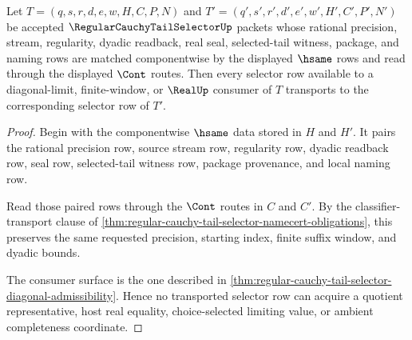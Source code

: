 \begin{theorem}
\label{thm:regular-cauchy-tail-selector-classifier-transport}
Let $T=(q,s,r,d,e,w,H,C,P,N)$ and $T'=(q',s',r',d',e',w',H',C',P',N')$ be accepted $\RegularCauchyTailSelectorUp$ packets whose rational precision, stream, regularity, dyadic readback, real seal, selected-tail witness, package, and naming rows are matched componentwise by the displayed $\hsame$ rows and read through the displayed $\Cont$ routes. Then every selector row available to a diagonal-limit, finite-window, or $\RealUp$ consumer of $T$ transports to the corresponding selector row of $T'$.
\end{theorem}
\begin{proof}
Begin with the componentwise $\hsame$ data stored in $H$ and $H'$. It pairs the rational precision row, source stream row, regularity row, dyadic readback row, seal row, selected-tail witness row, package provenance, and local naming row.

Read those paired rows through the $\Cont$ routes in $C$ and $C'$. By the classifier-transport clause of \autoref{thm:regular-cauchy-tail-selector-namecert-obligations}, this preserves the same requested precision, starting index, finite suffix window, and dyadic bounds.

The consumer surface is the one described in \autoref{thm:regular-cauchy-tail-selector-diagonal-admissibility}. Hence no transported selector row can acquire a quotient representative, host real equality, choice-selected limiting value, or ambient completeness coordinate.
\end{proof}

